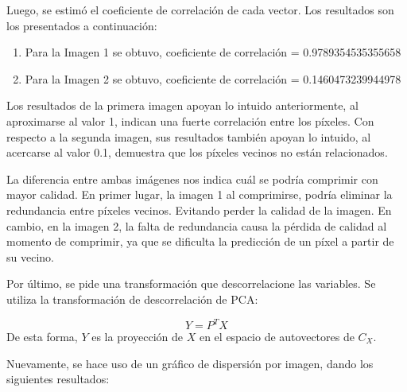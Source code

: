 \documentclass[a4paper,12pt]{article}
\begin{document}
Luego, se estimó el coeficiente de correlación de cada vector. Los resultados son los presentados a continuación:
\begin{enumerate}
    \item Para la Imagen 1 se obtuvo, 
    coeficiente de correlación = 0.9789354535355658

    \item Para la Imagen 2 se obtuvo, 
    coeficiente de correlación = 0.1460473239944978
\end{enumerate}

Los resultados de la primera imagen apoyan lo intuido anteriormente, al aproximarse al valor 1, indican una fuerte correlación entre los píxeles.
Con respecto a la segunda imagen, sus resultados también apoyan lo intuido, al acercarse al valor 0.1, demuestra que los píxeles vecinos no están relacionados.

\vspace{1em}

La diferencia entre ambas imágenes nos indica cuál se podría comprimir con mayor calidad. En primer lugar, la imagen 1 al comprimirse, podría eliminar la redundancia entre píxeles vecinos.
Evitando perder la calidad de la imagen. En cambio, en la imagen 2, la falta de redundancia causa la pérdida de calidad al momento de comprimir, ya que se dificulta la predicción de un píxel a partir de su vecino. 

\vspace{1em}

Por último, se pide una transformación que descorrelacione las variables.
Se utiliza la transformación de descorrelación de PCA:

\vspace{1em}

\[
Y = P^T X
\]
De esta forma, \(Y\) es la proyección de \(X\) en el espacio de autovectores de \(C_X\).

Nuevamente, se hace uso de un gráfico de dispersión por imagen, dando los siguientes resultados:
\end{document}
